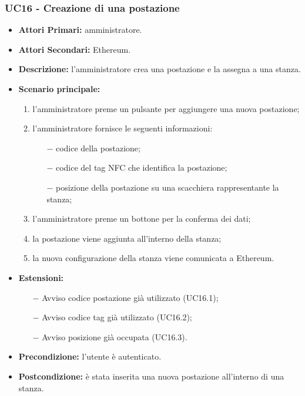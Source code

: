 \subsubsection{UC16 - Creazione di una postazione}
\begin{itemize}
	\item\textbf{Attori Primari:}
	amministratore.
	\item\textbf{Attori Secondari:}
	Ethereum.
	\item\textbf{Descrizione:}
	l'amministratore crea una postazione e la assegna a una stanza.
	\item\textbf{Scenario principale:} 
	\begin{enumerate}
		\item l'amministratore preme un pulsante per aggiungere una nuova postazione;
		\item l'amministratore fornisce le seguenti informazioni:
		\begin{itemize}
			\item[$-$] codice della postazione;
			\item[$-$] codice del tag NFC che identifica la postazione;
			\item[$-$] posizione della postazione su una scacchiera rappresentante la stanza;
		\end{itemize}
		\item l'amministratore preme un bottone per la conferma dei dati;
		\item la postazione viene aggiunta all'interno della stanza;
		\item la nuova configurazione della stanza viene comunicata a Ethereum.
	\end{enumerate}
	\item\textbf{Estensioni:}
	\begin{itemize}
		\item[$-$] Avviso codice postazione già utilizzato (UC16.1);
		\item[$-$] Avviso codice tag già utilizzato (UC16.2);
		\item[$-$] Avviso posizione già occupata (UC16.3).
	\end{itemize}
	\item\textbf{Precondizione:} 
	l'utente è autenticato.
	\item\textbf{Postcondizione:}
	è stata inserita una nuova postazione all'interno di una stanza.
\end{itemize}

